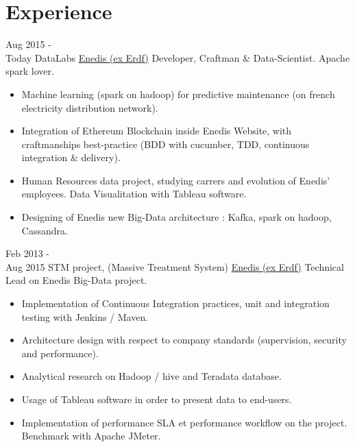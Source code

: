 \documentclass[letterpaper]{twentysecondcv} %
\begin{document}
\makeprofile %




\section{Experience}



\begin{twenty} %

	\twentyitem
    	{Aug 2015 - \\ Today}
        {DataLabs}
        {\href{http://www.enedis.fr/}{Enedis (ex Erdf)}}
        {Developer, Craftman \& Data-Scientist. Apache spark lover.}
        {
        {\begin{itemize}
        \item Machine learning (spark on hadoop) for predictive maintenance (on french electricity distribution network).
        \item Integration of Ethereum Blockchain inside Enedis Website, with craftmanships best-practice (BDD with cucumber, TDD, continuous integration \& delivery).
        \item Human Resources data project, studying carrers and evolution of Enedis' employees. Data Visualitation with Tableau software.
        \item Designing of Enedis new Big-Data architecture : Kafka, spark on hadoop, Cassandra.
    \end{itemize}}
        }
        
\twentyitem
    	{Feb 2013 - \\Aug 2015}
        {STM project, (Massive Treatment System)}
        {\href{http://www.enedis.fr/}{Enedis (ex Erdf)}}
        {Technical Lead on Enedis Big-Data project.}
        {
        {\begin{itemize}
        \item Implementation of Continuous Integration practices, unit and integration testing with Jenkins / Maven.
        \item Architecture design with respect to company standards (supervision, security and performance).
        \item Analytical research on Hadoop / hive and Teradata database.
        \item Usage of Tableau software in order to present data to end-users.
        \item Implementation of performance SLA et performance workflow on the project. Benchmark with Apache JMeter.
    \end{itemize}}
        }
        

\end{twenty}
\end{document}

